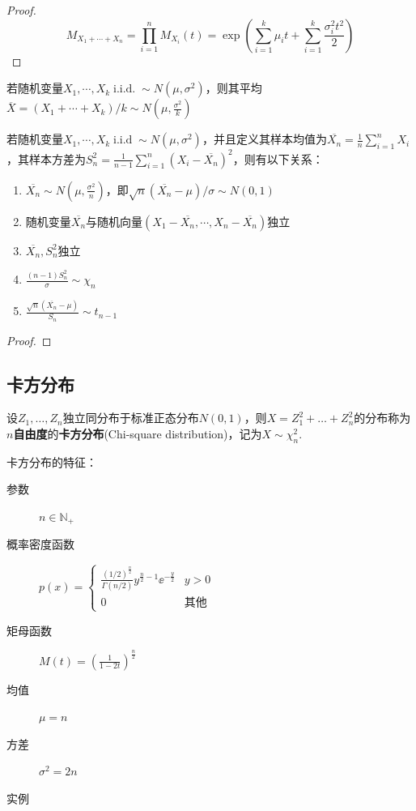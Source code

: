 \begin{proof}
    \[ M_{X_1+\cdots+ X_n} = \prod_{i=1}^n M_{X_i}(t)=\exp (\sum_{i=1}^k\mu_i t + \sum_{i=1}^k \frac{\sigma_i^2 t^2}{2}) \]
\end{proof}

\begin{corollary}
    若随机变量$X_1,\cdots ,X_k \operatorname{i.i.d.} \sim N(\mu,\sigma^2)$，则其平均$\overline{X}=(X_1+\cdots +X_k)/k \sim N(\mu,\frac{\sigma^2}{k})$
\end{corollary}

\begin{theorem}\label{thm:normal_sample_mean_variance}
    若随机变量$X_1,\cdots ,X_k \operatorname{i.i.d} \sim N(\mu,\sigma^2)$，并且定义其样本均值为$\overline{X_n}=\frac{1}{n}\sum_{i=1}^n X_i$，其样本方差为$S_n^2=\frac{1}{n-1}\sum_{i=1}^n (X_i-\overline{X_n})^2$，则有以下关系：
    \begin{enumerate}
        \item $\overline{X_n} \sim N(\mu,\frac{\sigma^2}{n})$，即$\sqrt{n}(\overline{X_n}-\mu)/\sigma \sim N(0,1)$
        \item 随机变量$\overline{X_n}$与随机向量$(X_1-\overline{X_n},\cdots ,X_n-\overline{X_n})$独立
        \item $\overline{X_n},S_n^2$独立
        \item $\frac{(n-1)S_n^2}{\sigma} \sim \chi_n$
        \item $\frac{\sqrt{n}(\overline{X_n}-\mu)}{S_n} \sim t_{n-1}$
    \end{enumerate}
\end{theorem}
\begin{proof}
\end{proof}

\subsection{卡方分布}

\begin{definition}
    设$Z_1,\dotsc,Z_n$独立同分布于标准正态分布$N(0,1)$，则$X=Z_1^2+\dotsc+Z_n^2$的分布称为\textbf{$n$自由度}的\textbf{卡方分布}(Chi-square distribution)，记为$X \sim \chi^2_n$.
\end{definition}

卡方分布的特征：
\begin{description}
    \item[参数] $n \in \mathbb{N}_+$
    \item[概率密度函数] $p(x)=\begin{cases}
                \frac{(1/2)^{\frac n2}}{\Gamma(n/2)}y^{\frac n2-1}\ee^{-\frac y2} & y>0         \\
                0                                                                 & \text{其他}
            \end{cases}$
    \item[矩母函数] $M(t)=(\frac{1}{1-2t})^{\frac{n}{2}}$
    \item[均值] $\mu=n$
    \item[方差] $\sigma^2=2n$
    \item[实例]
\end{description}

